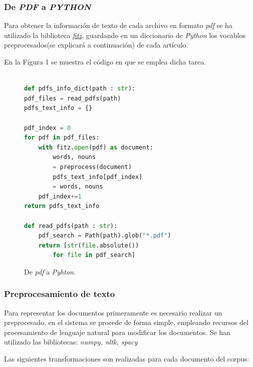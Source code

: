 \documentclass[a4paper,10pt,twocolumn]{article}
\begin{document}
        \subsubsection{De \emph{PDF} a \emph{PYTHON}}

        Para obtener la información de texto de cada archivo en formato \emph{pdf} se ha utilizado la biblioteca \href{https://mupdf.com}{\emph{fitz}}, guardando en un diccionario de \emph{Python} los vocablos preprocesados(se explicará a continuación) de cada artículo. 

        En la Figura 1 se muestra el código en que se emplea dicha tarea.


		\begin{figure}[htb]%
			\begin{lstlisting}[language=python]%

def pdfs_info_dict(path : str):
pdf_files = read_pdfs(path)
pdfs_text_info = {}

pdf_index = 0
for pdf in pdf_files:
    with fitz.open(pdf) as document:
        words, nouns 
        = preprocess(document)
        pdfs_text_info[pdf_index] 
        = words, nouns
    pdf_index+=1
return pdfs_text_info

def read_pdfs(path : str):
    pdf_search = Path(path).glob("*.pdf")
    return [str(file.absolute()) 
        for file in pdf_search]

			\end{lstlisting}
		\caption{De \emph{pdf} a \emph{Pyhton}.\label{fig:code}}
		\end{figure}


        \subsubsection{Preprocesamiento de texto}
        Para representar los documentos primeramente es necesario realizar un preprocesado, en el sistema se procede de forma simple, empleando recursos del procesamiento de lenguaje natural para modificar los documentos. Se han utilizado las bibliotecas: \emph{numpy, nltk, spacy} 
        
        Las siguientes transformaciones son realizadas para cada documento del corpus:
\end{document}

